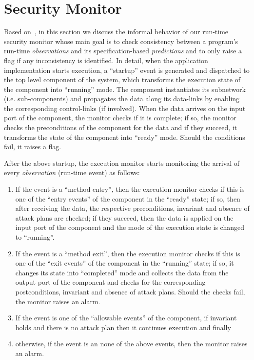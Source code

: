 \documentclass[conference]{IEEEtran}
\begin{document}
\section{Security Monitor}\label{sec:ad}
Based on~\cite{Shrobe:2006}, in this section we discuss the informal behavior of our run-time security monitor whose main goal is to check consistency between a program's run-time  \emph{observations} and its specification-based \emph{predictions} and to only raise a flag if any inconsistency is identified. In detail, when the application implementation starts execution, a ``startup'' event is generated and
dispatched to the top level component of the system, which transforms the execution state of the component
into ``running'' mode. The component instantiates its subnetwork (i.e. sub-components) and propagates
the data along its data-links by enabling the corresponding control-links (if involved). When the data arrives on the input port of the component, the monitor checks if it is complete; if so, the monitor checks the preconditions of the component for the data and if they succeed, it transforms the state of the component into ``ready'' mode. Should the conditions fail, it raises a flag.

After the above startup, the execution monitor starts monitoring the arrival of every \emph{observation} (run-time event) as follows:
\begin{enumerate}
\item If the event is a ``method entry'', then the execution monitor checks if this is one of the ``entry events'' of the component in the ``ready'' state; if so, then after receiving the data, the respective preconditions, invariant and absence of attack plans are checked; if they succeed, then the data is applied on the input port of the component and the mode of the execution state is changed to ``running''.
\item If the event is a ``method exit'', then the execution monitor checks if this is one of the ``exit events'' of the component in the ``running'' state; if so, it changes its state into ``completed'' mode and collects the data from the output port of the component and checks for the corresponding postconditions, invariant and absence of attack plans. Should the checks fail, the monitor raises an alarm.
\item If the event is one of the ``allowable events'' of the component, if invariant holds and there is no attack plan then it continues execution and finally
\item otherwise, if the event is an none of the above events, then the monitor raises an alarm.
\end{enumerate}
\end{document}
